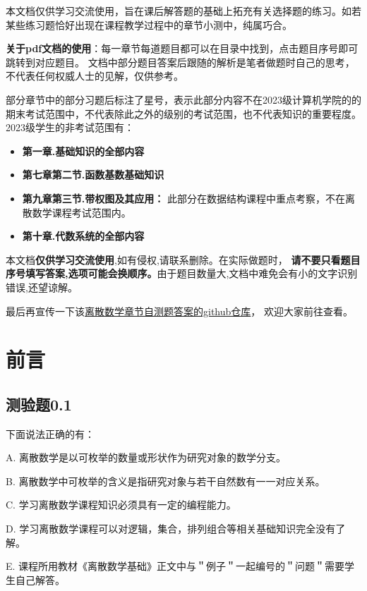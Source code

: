 \documentclass[UTF8, heading=true]{ctexart}
\begin{document}
本文档仅供学习交流使用，旨在课后解答题的基础上拓充有关选择题的练习。如若某些练习题恰好出现在课程教学过程中的章节小测中，纯属巧合。

\textbf{关于pdf文档的使用}：每一章节每道题目都可以在目录中找到，点击题目序号即可跳转到对应题目。
文档中部分题目答案后跟随的解析是笔者做题时自己的思考，不代表任何权威人士的见解，仅供参考。

部分章节中的部分习题后标注了星号，表示此部分内容不在2023级计算机学院的的期末考试范围中，不代表除此之外的级别的考试范围，也不代表知识的重要程度。
2023级学生的非考试范围有：
\begin{itemize}
  \item \textbf{第一章.基础知识的全部内容}
  \item \textbf{第七章第二节.函数基数基础知识}
  \item \textbf{第九章第三节.带权图及其应用：} 此部分在数据结构课程中重点考察，不在离散数学课程考试范围内。
  \item \textbf{第十章.代数系统的全部内容}
\end{itemize}

本文档\textbf{仅供学习交流使用},如有侵权,请联系删除。在实际做题时，
\textbf{请不要只看题目序号填写答案,选项可能会换顺序。}由于题目数量大,文档中难免会有小的文字识别错误,还望谅解。

最后再宣传一下该\href{https://github.com/BlackMaple1203/SYSU-Discrete-Mathematics-Exam-Answers}{离散数学章节自测题答案的github仓库}，
欢迎大家前往查看。


\clearpage

{}


\section*{前言}

\subsection{测验题0.1}

下面说法正确的有：

A. 离散数学是以可枚举的数量或形状作为研究对象的数学分支。

B. 离散数学中可枚举的含义是指研究对象与若干自然数有一一对应关系。

C. 学习离散数学课程知识必须具有一定的编程能力。

D. 学习离散数学课程可以对逻辑，集合，排列组合等相关基础知识完全没有了解。

E. 课程所用教材《离散数学基础》正文中与＂例子＂一起编号的＂问题＂需要学生自己解答。
\end{document}
